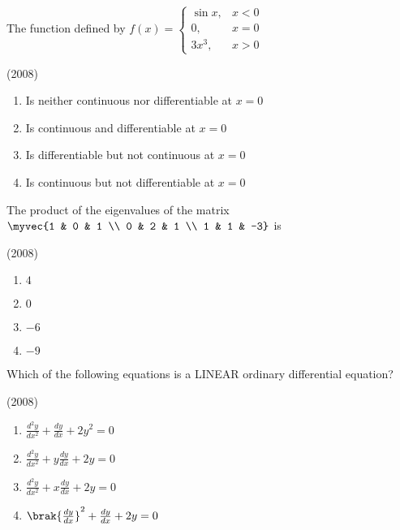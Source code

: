 \iffalse
	\chapter{2008}
	\author{AI24BTECH11003}
	\section{ae}
\fi
    \item The function defined by
    $
    f(x)=
    \begin{cases}
        \sin x, & x<0 \\
        0, & x=0\\
        3x^3, & x>0
    \end{cases}$
    
    \hfill{(2008)}

        \begin{enumerate}
            \item Is neither continuous nor differentiable at $x=0$
            \item Is continuous and differentiable at $x=0$
            \item Is differentiable but not continuous at $x=0$
            \item Is continuous but not differentiable at $x=0$
        \end{enumerate}

    \item The product of the eigenvalues of the matrix $\myvec{1 & 0 & 1 \\ 0 & 2 & 1 \\ 1 & 1 & -3}$ is
    
    \hfill{(2008)}
    
        \begin{multicols}{4}
            \begin{enumerate}
                \item $4$
                \item $0$
                \item $-6$
                \item $-9$
            \end{enumerate}
        \end{multicols}

    \item Which of the following equations is a LINEAR ordinary differential equation?
    
    \hfill{(2008)}

        \begin{multicols}{2}
            \begin{enumerate}
                \item $\frac{d^2y}{dx^2}+\frac{dy}{dx}+2y^2=0$
                \item $\frac{d^2y}{dx^2}+y\frac{dy}{dx}+2y=0$
                \item $\frac{d^2y}{dx^2}+x\frac{dy}{dx}+2y=0$
                \item $\brak{\frac{dy}{dx}}^2+\frac{dy}{dx}+2y=0$
            \end{enumerate}
        \end{multicols}

